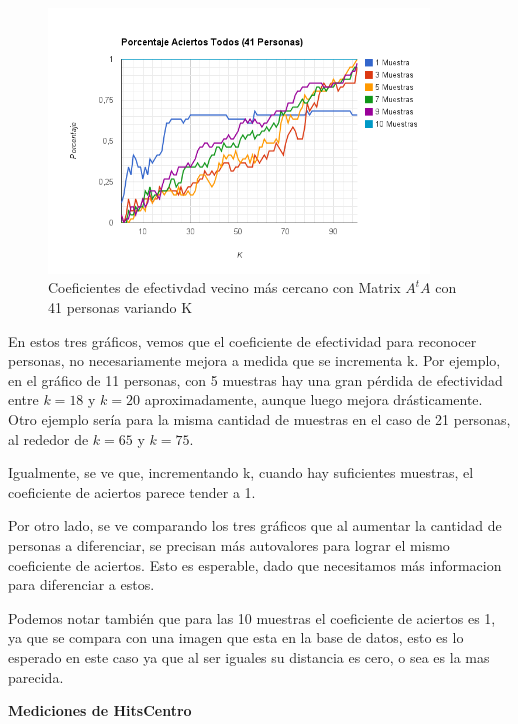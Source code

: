 \begin{figure}[H] \includegraphics[width=0.90\textwidth]{img/image12.png} \caption{Coeficientes de
    efectivdad vecino más cercano con Matrix $A^tA$ con 41 personas variando K} \end{figure}

En estos tres gr\'aficos, vemos que el coeficiente de efectividad para reconocer personas, no
necesariamente mejora a medida que se incrementa k. Por ejemplo, en el gr\'afico de 11 personas, con
5 muestras hay una gran p\'erdida de efectividad entre $k=18$ y $k=20$ aproximadamente, aunque luego
mejora dr\'asticamente. Otro ejemplo ser\'ia para la misma cantidad de muestras en el caso de 21
personas, al rededor de $k=65$ y $k=75$.

Igualmente, se ve que, incrementando k, cuando hay suficientes muestras, el coeficiente de aciertos
parece tender a 1.

Por otro lado, se ve comparando los tres gr\'aficos que al aumentar la cantidad de personas a
diferenciar, se precisan m\'as autovalores para lograr el mismo coeficiente de aciertos. Esto es
esperable, dado que necesitamos m\'as informacion para diferenciar a estos.

Podemos notar tambi\'en que para las 10 muestras el coeficiente de aciertos es 1, ya que se compara
con una imagen que esta en la base de datos, esto es lo esperado en este caso ya que al ser iguales
su distancia es cero, o sea es la mas parecida.

\newpage

\textbf{Mediciones de HitsCentro }

